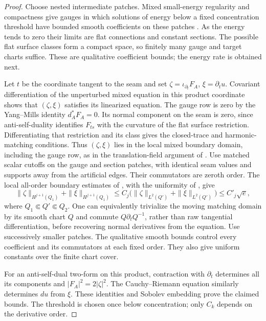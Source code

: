 \documentclass[11pt]{amsart}
\theoremstyle{definition}
\theoremstyle{remark}
\theoremstyle{plain}
\numberwithin{equation}{section}
\begin{document}
\begin{proof}
Choose nested intermediate patches. Mixed small-energy regularity
and compactness give gauges in which solutions of energy below a
fixed concentration threshold have bounded smooth coefficients on
these patches \cite[Theorem~4.2, Lemma~4.25 and pp.~38--39]{DFL-mixed}.
As the energy tends to zero their limits are flat connections and
constant sections. The possible flat surface classes form a compact
space, so finitely many gauge and target charts suffice. These are
qualitative coefficient bounds; the energy rate is obtained next.

Let $t$ be the coordinate tangent to the seam and set
$\zeta=\iota_{\partial_t}F_A$, $\xi=\partial_tu$.
Covariant differentiation of the unperturbed mixed equation in
this product coordinate shows that $(\zeta,\xi)$ satisfies its
linearized equation. The gauge row is zero by the Yang--Mills
identity $d_A^*F_A=0$. Its normal component on the seam is zero,
since anti-self-duality identifies $F_{ts}$ with the curvature of
the flat surface restriction. Differentiating that restriction and
its class gives the closed-trace and harmonic-matching conditions.
Thus $(\zeta,\xi)$ lies in the local mixed boundary domain,
including the gauge row, as in the translation-field argument of
\cite[Proposition~5.29]{DFL}. Use matched scalar cutoffs on the
gauge and section patches, with identical seam values and supports
away from the artificial edges. Their commutators are zeroth order.
The local all-order boundary estimates of
\cite[Theorems~5 and 5.9, Remarks~5.73 and 5.76]{DFL-mixed},
with the uniformity of \cite[Remark~4.19]{DFL}, give
\[
 \|\zeta\|_{H^{j+1}(Q_1)}+\|\xi\|_{H^{j+1}(Q_1)}
 \le C_j\bigl(\|\zeta\|_{L^2(Q')}+\|\xi\|_{L^2(Q')}\bigr)
 \le C'_j\sqrt e,
\]
where $Q_1\Subset Q'\Subset Q_2$. One can equivalently trivialize the moving matching domain by
its smooth chart $Q$ and commute $Q\partial_tQ^{-1}$, rather than
raw tangential differentiation, before recovering normal derivatives
from the equation. Use successively smaller patches. The
qualitative smooth bounds
control every coefficient and its commutators at each fixed order.
They also give uniform constants over the finite chart cover.

For an anti-self-dual two-form on this product, contraction with
$\partial_t$ determines all its components and
$|F_A|^2=2|\zeta|^2$. The Cauchy--Riemann equation similarly
determines $du$ from $\xi$. These identities and Sobolev embedding
prove the claimed bounds. The threshold is chosen once below
concentration; only $C_k$ depends on the derivative order.
\end{proof}
\end{document}
